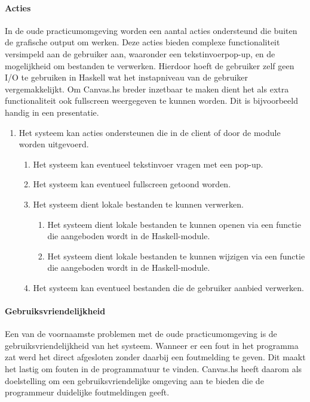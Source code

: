\paragraph{Acties} In de oude practicumomgeving worden een aantal acties ondersteund die buiten de grafische output om werken. Deze acties bieden complexe functionaliteit versimpeld aan de gebruiker aan, waaronder een tekstinvoerpop-up, en de mogelijkheid om bestanden te verwerken. Hierdoor hoeft de gebruiker zelf geen I/O te gebruiken in Haskell wat het instapniveau van de gebruiker vergemakkelijkt. Om Canvas.hs breder inzetbaar te maken dient het als extra functionaliteit ook fullscreen weergegeven te kunnen worden. Dit is bijvoorbeeld handig in een presentatie.

\begin{enumerate}[{R}1]
\setcounter{enumi}{\value{startvalue}}
	\item Het systeem kan acties ondersteunen die in de client of door de module worden uitgevoerd.
	\begin{enumerate}
		\item Het systeem kan eventueel tekstinvoer vragen met een pop-up.
		\item Het systeem kan eventueel fullscreen getoond worden.
		\item Het systeem dient lokale bestanden te kunnen verwerken.
		\begin{enumerate}
			\item Het systeem dient lokale bestanden te kunnen openen via een functie die aangeboden wordt in de Haskell-module.
			\item Het systeem dient lokale bestanden te kunnen wijzigen via een functie die aangeboden wordt in de Haskell-module.
		\end{enumerate}
		
		\item Het systeem kan eventueel bestanden die de gebruiker aanbied verwerken.
	\end{enumerate}
	\setcounter{startvalue}{\value{enumi}}
\end{enumerate}

\paragraph{Gebruiksvriendelijkheid} Een van de voornaamste problemen met de oude practicumomgeving is de gebruiksvriendelijkheid van het systeem. Wanneer er een fout in het programma zat werd het direct afgesloten zonder daarbij een foutmelding te geven. Dit maakt het lastig om fouten in de programmatuur te vinden. Canvas.hs heeft daarom als doelstelling om een gebruiksvriendelijke omgeving aan te bieden die de programmeur duidelijke foutmeldingen geeft.

